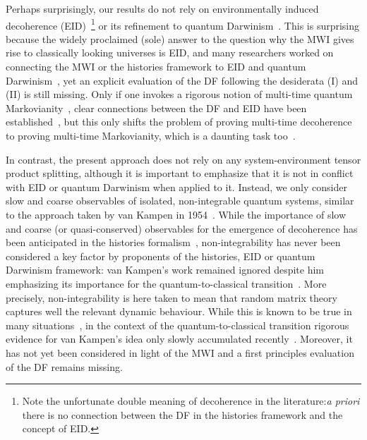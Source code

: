 \documentclass[pre,onecolumn,12pt,aps,longbibliography,nofootinbib]{revtex4-2}
\newcommand{\blue}[1]{#1}
\newcommand{\new}[1]{#1}
\begin{document}
Perhaps surprisingly, our results do {not} rely on environmentally induced decoherence (EID)~\cite{ZurekRMP2003, JoosEtAlBook2003, SchlosshauerPR2019}\footnote{Note the unfortunate double meaning of decoherence in the literature:\emph{a priori} there is no connection between the DF in the histories framework and the concept of EID.} or its refinement to quantum Darwinism~\cite{ZurekNP2009, KorbiczQuantum2021, ZurekEnt2022}. This is surprising because the widely proclaimed (sole) answer to the question why the MWI gives rise to classically looking universes is EID, and many researchers worked on connecting the MWI or the histories framework to EID and quantum Darwinism~\cite{FinkelsteinPRD1993, SaundersFP1993, PazZurekPRD1993, DiosiEtAlPRL1995, BrunPRL1997, YuPA1998, VaidmanISPS1998, BrunPRA2000, RiedelZurekZwolakPRA2016, RiedelPRL2017,  AlbrechtBaunachArrasmithPRD2022, TouilEtAlArXiv2022, StrasbergSP2023}, yet an explicit evaluation of the DF following the desiderata (I) and (II) is still missing. Only if one invokes a rigorous notion of multi-time quantum Markovianity~\cite{PollockEtAlPRL2018, LiHallWisemanPR2018, MilzModiPRXQ2021}, clear connections between the DF and EID have been established~\cite{PazZurekPRD1993, DiosiEtAlPRL1995, BrunPRL1997, YuPA1998, BrunPRA2000, StrasbergSP2023}, but this only shifts the problem of proving multi-time \new{decoherence} to proving multi-time Markovianity, which is a daunting task too~\cite{DuemckeJMP1983, FordOConnellPRL1996, FigueroaRomeroModiPollockQuantum2019, FigueroaRomeroPollockModiCP2021, StrasbergEtAlPRA2023}.

In contrast, the present approach does not rely on any system-environment tensor product splitting, although it is important to emphasize that it is {not} in conflict with EID or quantum Darwinism when applied to it. Instead, we only consider slow and coarse observables of isolated, non-integrable quantum systems, similar to the approach taken by van Kampen in 1954~\cite{VanKampenPhys1954}. While the importance of slow and coarse (or quasi-conserved) observables \new{for the emergence of decoherence} has been \new{anticipated in the histories formalism~\cite{GellMannHartlePRD1993, BrunHalliwellPRD1996, HalliwellPRD1998, HalliwellPRL1999, CalzettaHuPRD1999, HalliwellPRD2003, GellMannHartlePRA2007, HalliwellInBook2010}, non-integrability has never been considered} a key factor by proponents of the histories, EID or quantum Darwinism framework: van Kampen's work \new{remained} ignored despite him emphasizing its importance for the quantum-to-classical transition~\cite{VanKampenEtAlPT2000, VanKampenAJP2008}. \blue{More precisely, non-integrability is here taken to mean that random matrix theory captures well the relevant dynamic behaviour. While this is known to be true in many situations~\cite{Wigner1967, BrodyEtAlRMP1981, BeenakkerRMP1997, GuhrMuellerGroelingWeidenmuellerPR1998, HaakeBook2010, DAlessioEtAlAP2016, DeutschRPP2018}, in the context of the quantum-to-classical transition rigorous evidence for van Kampen's idea only slowly accumulated recently~\cite{GemmerSteinigewegPRE2014, SchmidtkeGemmerPRE2016, NationPorrasPRE2020, StrasbergEtAlPRA2023, StrasbergSP2023}. Moreover}, it has not yet been considered in light of the MWI and \new{a first principles evaluation of the DF remains missing.}
\end{document}
